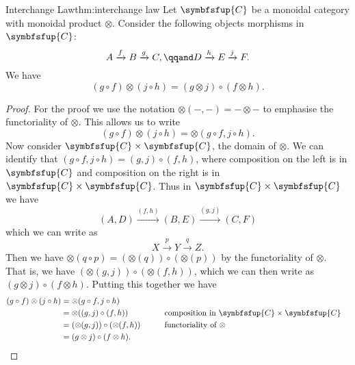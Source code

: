 \documentclass[fleqn]{NotesClass}
\newcommand{\cat}[1]{\symbfsfup{#1}}
\begin{document}
    \begin{thm}{Interchange Law}{thm:interchange law}
        Let \(\cat{C}\) be a monoidal category with monoidal product \(\otimes\).
        Consider the following objects morphisms in \(\cat{C}\):
        \begin{equation}
            A \xrightarrow{f} B \xrightarrow{g} C, \qqand D \xrightarrow{h} E \xrightarrow{j} F.
        \end{equation}
        We have
        \begin{equation}
            (g \circ f) \otimes (j \circ h) = (g \otimes j) \circ (f \otimes h).
        \end{equation}
        \begin{proof}
            For the proof we use the notation \(\otimes(-, -) = - \otimes -\) to emphasise the functoriality of \(\otimes\).
            This allows us to write
            \begin{equation}
                (g \circ f) \otimes (j \circ h) = \otimes(g \circ f, j \circ h).
            \end{equation}
            Now consider \(\cat{C} \times \cat{C}\), the domain of \(\otimes\).
            We can identify that \((g \circ f, j \circ h) = (g, j) \circ (f, h)\), where composition on the left is in \(\cat{C}\) and composition on the right is in \(\cat{C} \times \cat{C}\).
            Thus in \(\cat{C} \times \cat{C}\) we have
            \begin{equation}
                (A, D) \xrightarrow{(f, h)} (B, E) \xrightarrow{(g, j)} (C, F)
            \end{equation}
            which we can write as
            \begin{equation}
                X \xrightarrow{p} Y \xrightarrow{q} Z.
            \end{equation}
            Then we have \(\otimes(q \circ p) = (\otimes(q)) \circ (\otimes(p))\) by the functoriality of \(\otimes\).
            That is, we have \((\otimes(g, j)) \circ (\otimes(f, h))\), which we can then write as \((g \otimes j) \circ (f \otimes h)\).
            Putting this together we have
            \begin{alignat}{2}
                (g \circ f) \otimes (j \circ h) &= \otimes(g \circ f, j \circ h)\\
                &= \otimes((g, j) \circ (f, h)) \qquad && \text{composition in } \cat{C} \times \cat{C} \notag\\
                &= (\otimes(g, j)) \circ (\otimes(f, h)) \qquad && \text{functoriality of } \otimes \notag\\
                &= (g \otimes j) \circ (f \otimes h). \notag \qedhere
            \end{alignat}
        \end{proof}
    \end{thm}
    
\end{document}
